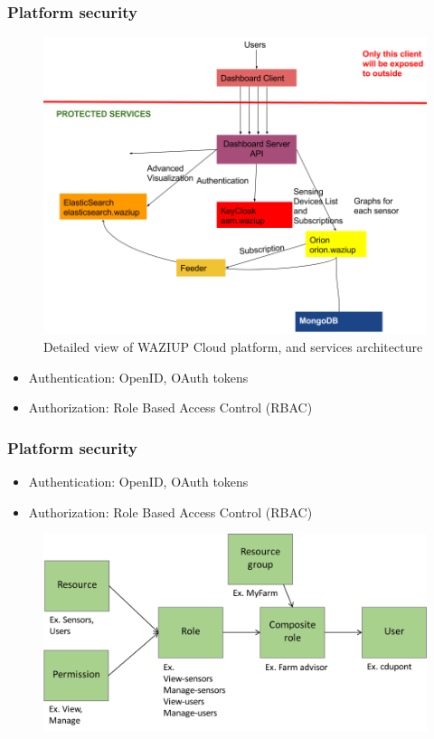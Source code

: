 \documentclass{beamer}
\begin{document}
\begin{frame}
\frametitle{Platform security}
  
  \begin{figure}[H]
  \centering
  \includegraphics[width=.6\linewidth]{figures/ServicesArchitecture.png}
  \caption{Detailed view of WAZIUP Cloud platform, and services architecture}
  \label{fig-services}
  \end{figure}

  \begin{itemize}
  \item Authentication: OpenID, OAuth tokens 
  \item Authorization: Role Based Access Control (RBAC)
  
  \end{itemize}

\end{frame}

\begin{frame}
\frametitle{Platform security}
  
  \begin{itemize}
  \item Authentication: OpenID, OAuth tokens 
  \item Authorization: Role Based Access Control (RBAC)
  \end{itemize}

  \begin{figure}[H]
  \centering
  \includegraphics[width=.6\linewidth]{figures/RBAC.png}
  \label{fig-services}
  \end{figure}

\end{frame}
\end{document}
